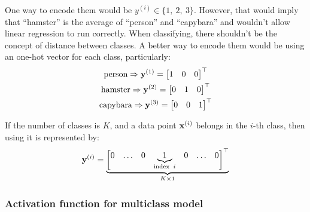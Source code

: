 \documentclass[a4paper]{article}
\begin{document}
One way to encode them would be $y^{(i)} \in \{1,\ 2,\ 3\}$. However, that would imply that ``hamster'' is the average of ``person'' and ``capybara'' and wouldn't allow linear regression to run correctly. When classifying, there shouldn't be the concept of distance between classes. A better way to encode them would be using an one-hot vector for each class, particularly:
\begin{gather*}
\textup{person} \Rightarrow \textbf{y}^{(1)} = \begin{bmatrix} 1 & 0 & 0\end{bmatrix}^\top\\
\textup{hamster} \Rightarrow \textbf{y}^{(2)} = \begin{bmatrix} 0 & 1 & 0\end{bmatrix}^\top\\
\textup{capybara} \Rightarrow \textbf{y}^{(3)} = \begin{bmatrix} 0 & 0 & 1\end{bmatrix}^\top\\
\end{gather*}
\begin{definition} If the number of classes is $K$, and a data point $\textbf{x}^{(i)}$  belongs in the $i$-th class, then using  it is represented by:
\begin{equation}
    \textbf{y}^{(i)} = \underbrace{\begin{bmatrix}0 & \ldots & 0 & \underbrace{1}_{\textup{index} \;\; i} &0 & \ldots  & 0\end{bmatrix}^\top}_{K \times 1}
\end{equation}
\end{definition}


\subsubsection{Activation function for multiclass model}
\end{document}
